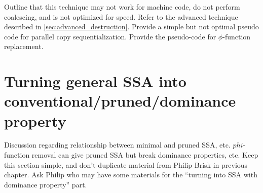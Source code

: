 Outline that this technique may not work for machine code, do not perform coalescing, and is not optimized for speed. Refer to the advanced technique described in \ref{sec:advanced_destruction}. Provide a simple but not optimal pseudo code for parallel copy sequentialization. Provide the pseudo-code for $\phi$-function replacement.

\section{Turning general SSA into conventional/pruned/dominance property}

Discussion regarding relationship between minimal and pruned SSA, etc.
$phi$-function removal can give pruned SSA but break
dominance properties, etc. Keep this section simple, and don't duplicate
material from Philip Brisk in previous chapter.
Ask Philip who may have some materials for the ``turning into SSA with dominance property'' part.

